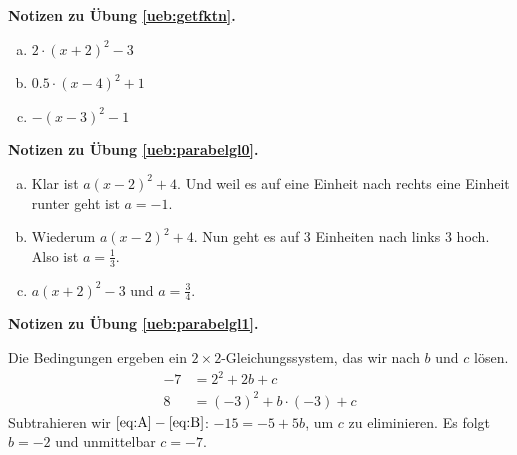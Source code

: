 \documentclass[%
11pt,%
twoside,%
titlepage,%
german,%
headsepline%
]{scrartcl}
\newcommand{\concatueb}[1]{ueb:#1}%
\newcommand{\concatlsg}[1]{lsg:#1}%
\newenvironment{lsg}[1]{%
    \par\noindent\textbf{Notizen zu Übung \ref{\concatueb{#1}}.}%
    \label{\concatlsg{#1}}
}{%
    \par%
}
\begin{document}
\begin{lsg}{getfktn}
    \begin{enumerate}[a)]
        \item $2\cdot(x+2)^2-3$
        \item $0.5\cdot(x-4)^2+1$
        \item $-(x-3)^2-1$
    \end{enumerate}
\end{lsg}
\begin{lsg}{parabelgl0}
\begin{enumerate}[a)]
\item  Klar ist $a(x-2)^2+4$. Und weil es auf eine Einheit nach rechts eine Einheit runter geht ist $a=-1$.
\item Wiederum $a(x-2)^2+4$. Nun geht es auf $3$ Einheiten nach links $3$ hoch. Also ist $a=\frac{1}{3}$.
\item  $a(x+2)^2-3$ und $a=\frac{3}{4}$.
\end{enumerate}
\end{lsg}
\begin{lsg}{parabelgl1}
    Die Bedingungen ergeben ein $2\times2$-Gleichungssystem, das wir nach $b$ und $c$ lösen.
    \begin{align}
        -7 &= 2^2+2b+c\label{eq:A}\\
        8 &= (-3)^2+b\cdot(-3)+c\label{eq:B}
    \end{align}
    Subtrahieren wir $\eqref{eq:A}-\eqref{eq:B}$: $-15 = -5+5b$, um $c$ zu eliminieren. Es folgt $b=-2$ und unmittelbar $c=-7$.
\end{lsg}
\end{document}
